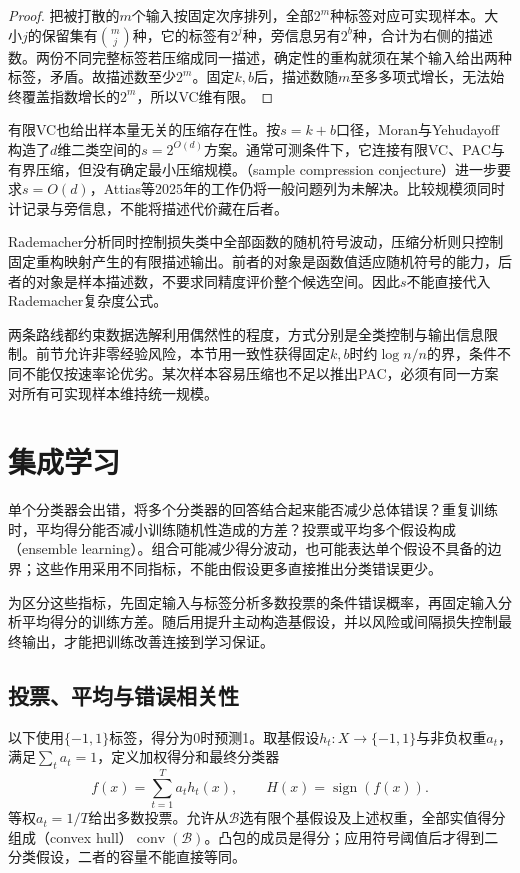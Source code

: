 \begin{proof}
把被打散的$m$个输入按固定次序排列，全部$2^m$种标签对应可实现样本。大小$j$的保留集有$\binom mj$种，它的标签有$2^j$种，旁信息另有$2^b$种，合计为右侧的描述数。两份不同完整标签若压缩成同一描述，确定性的重构就须在某个输入给出两种标签，矛盾。故描述数至少$2^m$。固定$k,b$后，描述数随$m$至多多项式增长，无法始终覆盖指数增长的$2^m$，所以VC维有限。
\end{proof}

有限VC也给出样本量无关的压缩存在性。按$s=k+b$口径，Moran与Yehudayoff构造了$d$维二类空间的$s=2^{O(d)}$方案。通常可测条件下，它连接有限VC、PAC与有界压缩，但没有确定最小压缩规模。（sample compression conjecture）进一步要求$s=O(d)$，Attias等2025年的工作仍将一般问题列为未解决。比较规模须同时计记录与旁信息，不能将描述代价藏在后者。

Rademacher分析同时控制损失类中全部函数的随机符号波动，压缩分析则只控制固定重构映射产生的有限描述输出。前者的对象是函数值适应随机符号的能力，后者的对象是样本描述数，不要求同精度评价整个候选空间。因此$s$不能直接代入Rademacher复杂度公式。

两条路线都约束数据选解利用偶然性的程度，方式分别是全类控制与输出信息限制。前节允许非零经验风险，本节用一致性获得固定$k,b$时约$\log n/n$的界，条件不同不能仅按速率论优劣。某次样本容易压缩也不足以推出PAC，必须有同一方案对所有可实现样本维持统一规模。

\section{集成学习}
\label{sec:boosting}

单个分类器会出错，将多个分类器的回答结合起来能否减少总体错误？重复训练时，平均得分能否减小训练随机性造成的方差？投票或平均多个假设构成（ensemble learning）。组合可能减少得分波动，也可能表达单个假设不具备的边界；这些作用采用不同指标，不能由假设更多直接推出分类错误更少。

为区分这些指标，先固定输入与标签分析多数投票的条件错误概率，再固定输入分析平均得分的训练方差。随后用提升主动构造基假设，并以风险或间隔损失控制最终输出，才能把训练改善连接到学习保证。

\subsection{投票、平均与错误相关性}

以下使用$\{-1,1\}$标签，得分为0时预测1。取基假设$h_t:X\to\{-1,1\}$与非负权重$a_t$，满足$\sum_ta_t=1$，定义加权得分和最终分类器
\[
 f(x)=\sum_{t=1}^T a_t h_t(x),\qquad H(x)=\operatorname{sign}(f(x)).
\]
等权$a_t=1/T$给出多数投票。允许从$\mathcal B$选有限个基假设及上述权重，全部实值得分组成（convex hull）$\operatorname{conv}(\mathcal B)$。凸包的成员是得分；应用符号阈值后才得到二分类假设，二者的容量不能直接等同。

